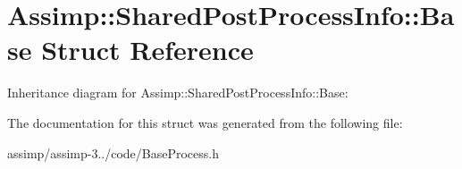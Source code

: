 \hypertarget{struct_assimp_1_1_shared_post_process_info_1_1_base}{\section{Assimp\+:\+:Shared\+Post\+Process\+Info\+:\+:Base Struct Reference}
\label{struct_assimp_1_1_shared_post_process_info_1_1_base}
}


Inheritance diagram for Assimp\+:\+:Shared\+Post\+Process\+Info\+:\+:Base\+:


The documentation for this struct was generated from the following file\+:\begin{DoxyCompactItemize}
\item 
assimp/assimp-\/3../code/Base\+Process.\+h\end{DoxyCompactItemize}
